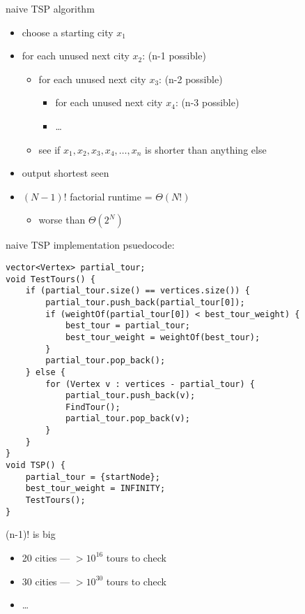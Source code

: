 \begin{frame}{naive TSP algorithm}
\begin{itemize}
\item choose a starting city $x_1$
\item for each unused next city $x_2$: (n-1 possible)
    \begin{itemize}
    \item for each unused next city $x_3$: (n-2 possible)
    \begin{itemize}
    \item for each unused next city $x_4$: (n-3 possible)
    \item \ldots
    \end{itemize}
    \item see if $x_1,x_2,x_3,x_4,\ldots,x_n$ is shorter than anything else
    \end{itemize}
\item output shortest seen
\vspace{.5cm}
\item $(N-1)!$ factorial runtime = $\Theta(N!)$ 
    \begin{itemize}
    \item worse than $\Theta(2^N)$
    \end{itemize}
\end{itemize}
\end{frame}

\begin{frame}[fragile,label=implNaiveTSP]{naive TSP implementation}
\lstset{language=C++,style=smaller}
psuedocode:
\begin{lstlisting}
vector<Vertex> partial_tour;
void TestTours() {
    if (partial_tour.size() == vertices.size()) {
        partial_tour.push_back(partial_tour[0]);
        if (weightOf(partial_tour[0]) < best_tour_weight) {
            best_tour = partial_tour;
            best_tour_weight = weightOf(best_tour);
        }
        partial_tour.pop_back();
    } else {
        for (Vertex v : vertices - partial_tour) {
            partial_tour.push_back(v);
            FindTour();
            partial_tour.pop_back(v);
        }
    }
}
void TSP() {
    partial_tour = {startNode};
    best_tour_weight = INFINITY;
    TestTours();
}
\end{lstlisting}
\end{frame}

\begin{frame}{(n-1)! is big}
\begin{itemize}
\item 20 cities --- $>10^{16}$ tours to check
\item 30 cities --- $>10^{30}$ tours to check
\item \ldots
\end{itemize}
\end{frame}

